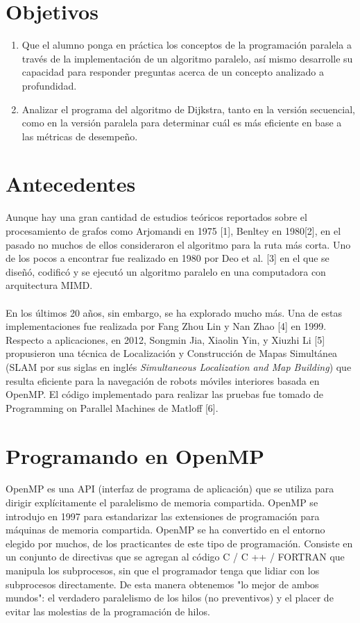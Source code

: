 \documentclass[11pt]{article}
\begin{document}
\section{Objetivos}
\begin{enumerate}
\item Que el alumno ponga en práctica los conceptos de la programación paralela a través de la implementación de un algoritmo paralelo, así mismo desarrolle su capacidad para responder preguntas acerca de un concepto analizado a profundidad.
\item Analizar el programa del algoritmo de Dijkstra, tanto en la versión secuencial, como en la versión paralela para determinar cuál es más eficiente en base a las métricas de desempeño.

\end{enumerate}

\section{Antecedentes}
Aunque hay una gran cantidad de estudios teóricos reportados sobre el procesamiento de grafos como Arjomandi en 1975 [1], Benltey en 1980[2], en el pasado no muchos de ellos consideraron el algoritmo para la ruta más corta. Uno de los pocos a encontrar fue realizado en 1980 por Deo et al. [3] en el que se diseñó, codificó y se ejecutó un algoritmo paralelo en una computadora con arquitectura MIMD. 

\paragraph{}
En los últimos 20 años, sin embargo, se ha explorado mucho más. Una de estas implementaciones fue realizada por Fang Zhou Lin y Nan Zhao [4] en 1999. Respecto a aplicaciones, en 2012, Songmin Jia, Xiaolin Yin, y Xiuzhi Li [5] propusieron una técnica de Localización y Construcción de Mapas Simultánea (SLAM por sus siglas en inglés \textit {Simultaneous Localization and Map Building}) que resulta eficiente para la navegación de robots móviles interiores basada en OpenMP. 
El código implementado para realizar las pruebas fue tomado de Programming on Parallel Machines de Matloff [6].


\section{Programando en OpenMP}
OpenMP es una API (interfaz de programa de aplicación) que se utiliza para dirigir explícitamente el paralelismo de memoria compartida. OpenMP se introdujo en 1997 para estandarizar las extensiones de programación para máquinas de memoria compartida. OpenMP se ha convertido en el entorno elegido por muchos, de los practicantes de este tipo de programación. Consiste en un conjunto de directivas que se agregan al código C / C ++ / FORTRAN que manipula los subprocesos, sin que el programador tenga que lidiar con los subprocesos directamente. De esta manera obtenemos "lo mejor de ambos mundos": el verdadero paralelismo de los hilos (no preventivos) y el placer de evitar las molestias de la programación de hilos. 
\end{document}
